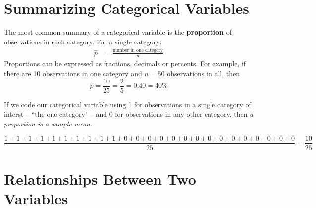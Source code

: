 \documentclass[twoside]{book}\usepackage[]{graphicx}\usepackage[]{xcolor}
\def\term#1{\textbf{#1}}
\newcounter{example}[section]
\begin{document}

\section{Summarizing Categorical Variables}

The most common summary of a categorical variable is the \term{proportion} 
of observations in each category. For a single category:
\begin{align*}
\hat p & = \frac{\mbox{number in one category}}{n}
\end{align*}
Proportions can be expressed as fractions, decimals or percents.  
For example, if there are 
10 observations in one category and $n=50$ observations in all, then 
\[
\hat p = \frac{10}{25} = \frac{2}{5} =  0.40 = 40\%
\]

If we code our categorical variable using 1 for observations in a
single category of interst -- ``the one category" --
and 0 for observations in any other category, then
\emph{a proportion is a sample mean}.

\[
\frac{ 1 + 1 + 1 + 1 + 1 + 1 + 1 + 1 + 1 + 1 + 
0 + 0 + 0 + 0 + 0 + 0 + 0 + 0 + 0 + 0 + 0 + 0 + 0 + 0 + 0 }{25} = \frac{10}{25}
\]

\section{Relationships Between Two Variables}
\end{document}
